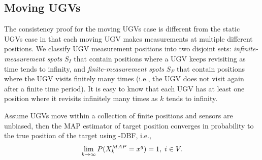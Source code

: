 	\subsection{Moving UGVs}
	The consistency proof for the moving UGVs case is different from the static UGVs case in that each moving UGV makes measurements at multiple different positions.
	We classify UGV measurement positions into two disjoint sets: \textit{infinite-measurement spots} $S_I$ that contain positions where a UGV keeps revisiting as time tends to infinity, and \textit{finite-measurement spots} $S_F$ that contain positions where the UGV visits finitely many times (i.e., the UGV does not visit again after a finite time period).
	It is easy to know that each UGV has at least one position where it revisits infinitely many times as $k$ tends to infinity.
%		
			
	\begin{thm}\label{thm:\proto-dbf-mov-ugv}
		Assume UGVs move within a collection of finite positions and sensors are unbiased, then the MAP estimator of target position converges in probability to the true position of the target using \proto-DBF, i.e.,
		\small\begin{equation*}
		\lim\limits_{k\rightarrow \infty}
		P(X^{MAP}_k=x^g)=1,\;i\in V.
		\end{equation*}\normalsize
	\end{thm}
		
